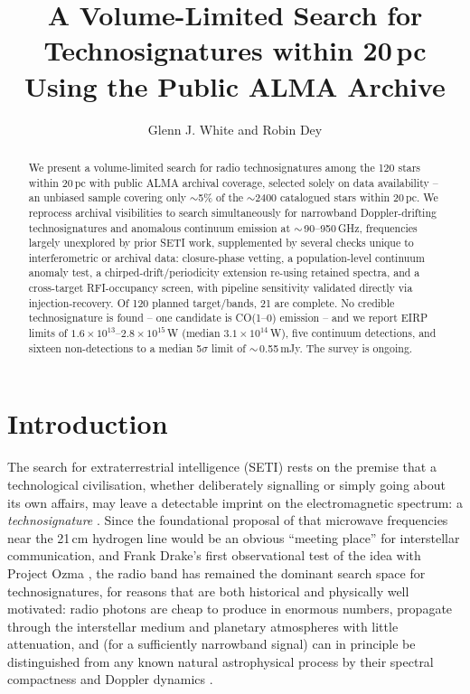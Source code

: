 \documentclass{openjournal}
\begin{document}
\title{A Volume-Limited Search for Technosignatures within 20\,pc Using the Public ALMA Archive}

\author{Glenn J. White and Robin Dey}

\begin{abstract}
We present a volume-limited search for radio technosignatures among the
120 stars within 20\,pc with public ALMA archival coverage, selected
solely on data availability -- an unbiased sample covering only
$\sim$5\% of the $\sim$2400 catalogued stars within 20\,pc. We reprocess
archival visibilities to search simultaneously for narrowband
Doppler-drifting technosignatures and anomalous continuum emission at
$\sim$\,90--950\,GHz, frequencies largely unexplored by prior SETI work,
supplemented by several checks unique to interferometric or archival
data: closure-phase vetting, a population-level continuum anomaly test,
a chirped-drift/periodicity extension re-using retained spectra, and a
cross-target RFI-occupancy screen, with pipeline sensitivity validated
directly via injection-recovery. Of 120 planned target/bands, 21 are
complete. No credible technosignature is found -- one candidate is
CO(1--0) emission -- and we report EIRP limits of
$1.6\times10^{13}$--$2.8\times10^{15}$\,W (median $3.1\times10^{14}$\,W),
five continuum detections, and sixteen non-detections to a median
5$\sigma$ limit of $\sim$\,0.55\,mJy. The survey is ongoing.
\end{abstract}


\section{Introduction}
\label{sec:intro}

The search for extraterrestrial intelligence (SETI) rests on the premise that a
technological civilisation, whether deliberately signalling or simply going about
its own affairs, may leave a detectable imprint on the electromagnetic spectrum: a
\emph{technosignature} \citep{Sheikh2020,SETIreview2025}. Since the foundational
proposal of \citet{CocconiMorrison1959} that microwave frequencies near the 21\,cm
hydrogen line would be an obvious ``meeting place'' for interstellar communication,
and Frank Drake's first observational test of the idea with Project Ozma
\citep{Drake1960}, the radio band has remained the dominant search space for
technosignatures, for reasons that are both historical and physically well
motivated: radio photons are cheap to produce in enormous numbers, propagate
through the interstellar medium and planetary atmospheres with little attenuation,
and (for a sufficiently narrowband signal) can in principle be distinguished from
any known natural astrophysical process by their spectral compactness and Doppler
dynamics \citep{Sheikh2020}.
\end{document}
